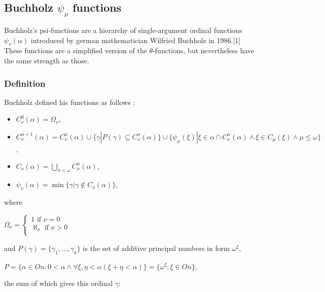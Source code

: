 \documentclass[10pt]{article}
\begin{document}
\subsection{Buchholz \( \psi_\nu \) functions}

Buchholz's psi-functions are a hierarchy of single-argument ordinal functions \(\psi_\nu(\alpha)\) introduced by german mathematician Wilfried Buchholz in 1986.[1] These functions are a simplified version of the \(\theta\)-functions, but nevertheless have the same strength as those.

\subsubsection{Definition}

Buchholz defined his functions as follows :

\begin{itemize}
     \setlength{\itemsep}{1pt}
     \setlength{\parskip}{0pt}
     \setlength{\parsep}{0pt}

\item \(C_\nu^0(\alpha) = \Omega_\nu\),

\item \(C_\nu^{n+1}(\alpha) = C_\nu^n(\alpha) \cup \{\gamma | P(\gamma) \subseteq C_\nu^n(\alpha)\} \cup \{\psi_\mu(\xi) | \xi \in \alpha \cap C_\nu^n(\alpha) \wedge \xi \in C_\mu(\xi) \wedge \mu \leq \omega\}\),

\item \(C_\nu(\alpha) = \bigcup_{n < \omega} C_\nu^n (\alpha)\),

\item \(\psi_\nu(\alpha) = \min\{\gamma | \gamma \not\in C_\nu(\alpha)\}\),

\end{itemize}

where

\(\Omega_\nu=\left\{\begin{array}{lcr} 1\text{ if }\nu=0\\ \aleph_\nu\text{ if }\nu>0\\ \end{array}\right.\)

and \(P(\gamma)=\{\gamma_1,...,\gamma_k\}\) is the set of additive principal numbers in form \(\omega^\xi\),

\(P=\{\alpha\in On: 0<\alpha \wedge \forall \xi, \eta < \alpha (\xi+\eta < \alpha)\}=\{\omega^\xi: \xi \in On\}\),

the sum of which gives this ordinal \(\gamma\):
\end{document}

